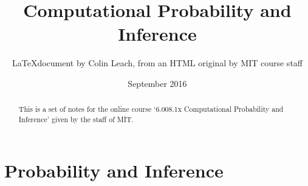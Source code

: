 



\title{Computational Probability and Inference}
\author{\LaTeX document by Colin Leach, from an HTML original by MIT course staff\\}
\date{September 2016}
\maketitle

\begin{abstract}
This is a set of notes for the online course `6.008.1x Computational Probability and Inference' given by the staff of MIT.
\end{abstract}

\tableofcontents

\setlength{\parindent}{0pt}
\setlength{\parskip}{0.5em}
\setlength{\intextsep}{2mm}

\newpage
\section{Probability and Inference}








